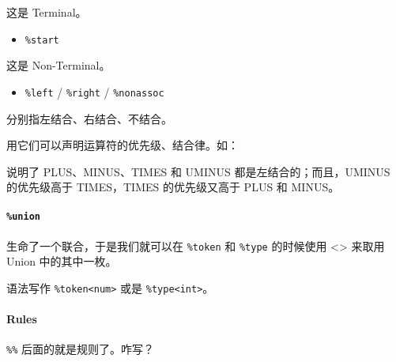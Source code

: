 \documentclass[
]{article}
\newenvironment{Shaded}{}{}
\newcommand{\DataTypeTok}[1]{\textcolor[rgb]{0.56,0.13,0.00}{#1}}
\newcommand{\KeywordTok}[1]{\textcolor[rgb]{0.00,0.44,0.13}{\textbf{#1}}}
\newcommand{\NormalTok}[1]{#1}
\begin{document}
这是 Terminal。

\begin{itemize}
\item
  \texttt{\%start}
\end{itemize}

这是 Non-Terminal。

\begin{itemize}
\item
  \texttt{\%left} / \texttt{\%right} / \texttt{\%nonassoc}
\end{itemize}

分别指左结合、右结合、不结合。

用它们可以声明运算符的优先级、结合律。如：

\begin{Shaded}
\begin{Highlighting}[]
\KeywordTok{%left}\NormalTok{ PLUS MINUS}
\KeywordTok{%left}\NormalTok{ TIMES}
\KeywordTok{%left}\NormalTok{ UMINUS}
\end{Highlighting}
\end{Shaded}

说明了 PLUS、MINUS、TIMES 和 UMINUS 都是左结合的；而且，UMINUS
的优先级高于 TIMES，TIMES 的优先级又高于 PLUS 和 MINUS。

\hypertarget{header-n65}{%
\paragraph{\texorpdfstring{\texttt{\%union}}{\%union}}\label{header-n65}}

\begin{Shaded}
\end{Shaded}

生命了一个联合，于是我们就可以在 \texttt{\%token} 和 \texttt{\%type}
的时候使用 \textless\textgreater{} 来取用 Union 中的其中一枚。

语法写作 \texttt{\%token\textless{}num\textgreater{}} 或是
\texttt{\%type\textless{}int\textgreater{}}。

\hypertarget{header-n69}{%
\paragraph{Rules}\label{header-n69}}

\texttt{\%\%} 后面的就是规则了。咋写？
\end{document}
